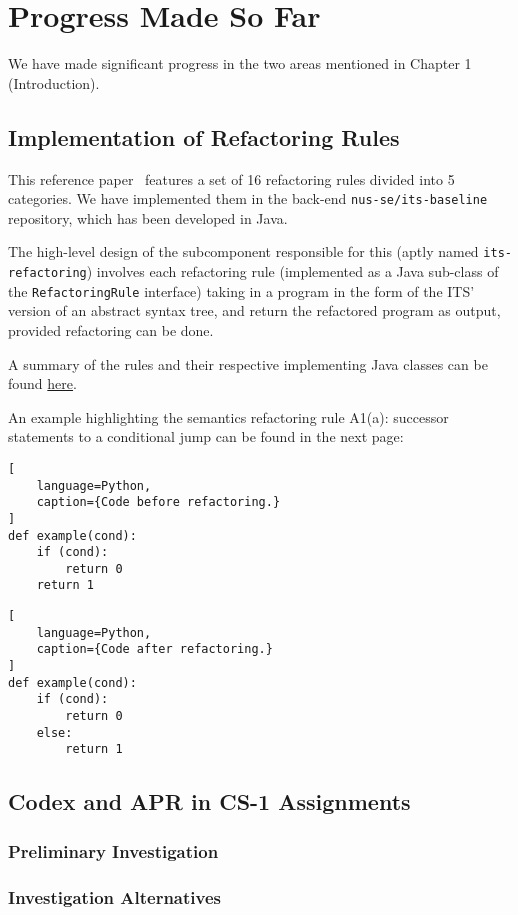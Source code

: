 \chapter{Progress Made So Far}
We have made significant progress in the two areas mentioned in Chapter 1 (Introduction).

\section{Implementation of Refactoring Rules}

This reference paper~\cite{hu2019re} features a set of 16 refactoring rules divided into 5 categories.
We have implemented them in the back-end
\texttt{nus-se/its-baseline} repository,
which has been developed in Java.

The high-level design of the subcomponent responsible for this (aptly named \texttt{its-refactoring})
involves each refactoring rule (implemented as a Java sub-class of the \texttt{RefactoringRule} interface)
taking in a program in the form of the ITS' version of an abstract syntax tree, and return the refactored
program as output, provided refactoring can be done.

A summary of the rules and their respective implementing Java classes can be found
\href{https://docs.google.com/document/d/1MnEVEUaiQ1A2MWca_qPiktKZdP6hV-1CLTXcWwK6PyE/edit}{here}.

An example highlighting the semantics refactoring rule A1(a): successor statements to a
conditional jump can be found in the next page:

\pagebreak

\begin{multicols}{2}
\begin{lstlisting}[
    language=Python,
    caption={Code before refactoring.}
]
def example(cond):
    if (cond):
        return 0
    return 1
\end{lstlisting}

\columnbreak

\begin{lstlisting}[
    language=Python,
    caption={Code after refactoring.}
]
def example(cond):
    if (cond):
        return 0
    else:
        return 1
\end{lstlisting}
\end{multicols}

\section{Codex and APR in CS-1 Assignments}

\subsection{Preliminary Investigation}

\subsection{Investigation Alternatives}
